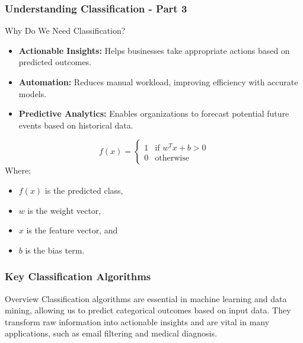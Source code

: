 \documentclass[aspectratio=169]{beamer}
\begin{document}
\begin{frame}[fragile]
    \frametitle{Understanding Classification - Part 3}
    \begin{block}{Why Do We Need Classification?}
        \begin{itemize}
            \item \textbf{Actionable Insights:} Helps businesses take appropriate actions based on predicted outcomes.
            \item \textbf{Automation:} Reduces manual workload, improving efficiency with accurate models.
            \item \textbf{Predictive Analytics:} Enables organizations to forecast potential future events based on historical data.
        \end{itemize}
    \end{block}

    \begin{equation}
        f(x) = 
        \begin{cases} 
            1 & \text{if } w^T x + b > 0 \\ 
            0 & \text{otherwise} 
        \end{cases}
        \label{eq:classification}
    \end{equation}
    Where:
    \begin{itemize}
        \item $f(x)$ is the predicted class,
        \item $w$ is the weight vector,
        \item $x$ is the feature vector, and
        \item $b$ is the bias term.
    \end{itemize}
\end{frame}

\begin{frame}[fragile]
    \frametitle{Key Classification Algorithms}
    \begin{block}{Overview}
        Classification algorithms are essential in machine learning and data mining, allowing us to predict categorical outcomes based on input data. They transform raw information into actionable insights and are vital in many applications, such as email filtering and medical diagnosis.
    \end{block}
\end{frame}
\end{document}
